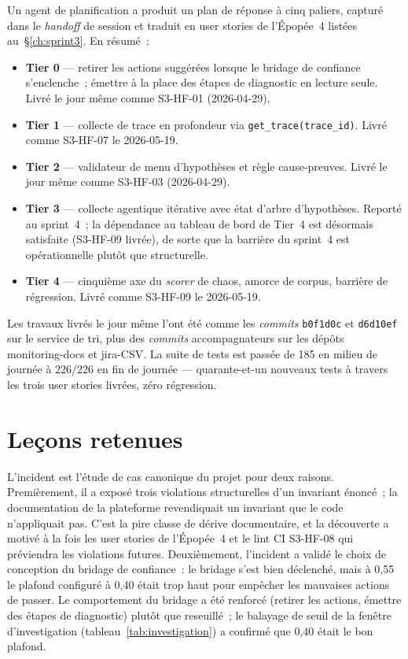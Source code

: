 \documentclass[11pt,a4paper,oneside]{report}
\begin{document}
Un agent de planification a produit un plan de réponse à cinq
paliers, capturé dans le \emph{handoff} de session et traduit en
user stories de l'Épopée~4 listées au~\S\ref{ch:sprint3}. En
résumé~:

\begin{itemize}
  \item \textbf{Tier 0} --- retirer les actions suggérées lorsque
        le bridage de confiance s'enclenche~; émettre à la place
        des étapes de diagnostic en lecture seule. Livré le jour
        même comme S3-HF-01 (2026-04-29).
  \item \textbf{Tier 1} --- collecte de trace en profondeur via
        \texttt{get\_trace(trace\_id)}. Livré comme S3-HF-07 le
        2026-05-19.
  \item \textbf{Tier 2} --- validateur de menu d'hypothèses et
        règle cause-preuves. Livré le jour même comme S3-HF-03
        (2026-04-29).
  \item \textbf{Tier 3} --- collecte agentique itérative avec état
        d'arbre d'hypothèses. Reporté au sprint~4~; la dépendance
        au tableau de bord de Tier~4 est désormais satisfaite
        (S3-HF-09 livrée), de sorte que la barrière du sprint~4
        est opérationnelle plutôt que structurelle.
  \item \textbf{Tier 4} --- cinquième axe du \emph{scorer} de
        chaos, amorce de corpus, barrière de régression. Livré
        comme S3-HF-09 le 2026-05-19.
\end{itemize}

Les travaux livrés le jour même l'ont été comme les \emph{commits}
\texttt{b0f1d0c} et \texttt{d6d10ef} sur le service de tri, plus
des \emph{commits} accompagnateurs sur les dépôts monitoring-docs
et jira-CSV. La suite de tests est passée de 185 en milieu de
journée à 226/226 en fin de journée --- quarante-et-un nouveaux
tests à travers les trois user stories livrées, zéro régression.

\section{Leçons retenues}

L'incident est l'étude de cas canonique du projet pour deux
raisons. Premièrement, il a exposé trois violations structurelles
d'un invariant énoncé~; la documentation de la plateforme
revendiquait un invariant que le code n'appliquait pas. C'est la
pire classe de dérive documentaire, et la découverte a motivé à la
fois les user stories de l'Épopée~4 et le lint CI S3-HF-08 qui
préviendra les violations futures. Deuxièmement, l'incident a
validé le choix de conception du bridage de confiance~: le bridage
s'est bien déclenché, mais à 0,55 le plafond configuré à 0,40 était
trop haut pour empêcher les mauvaises actions de passer. Le
comportement du bridage a été renforcé (retirer les actions, émettre
des étapes de diagnostic) plutôt que reseuillé~; le balayage de
seuil de la fenêtre d'investigation
(tableau~\ref{tab:investigation}) a confirmé que 0,40 était le bon
plafond.
\end{document}
